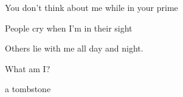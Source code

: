 \begin{multicols}{2}
{      You don't think about me while in your prime

      People cry when I'm in their sight

      Others lie with me all day and night.

      What am I?
  }{a tombstone}


\fi

\end{multicols}

